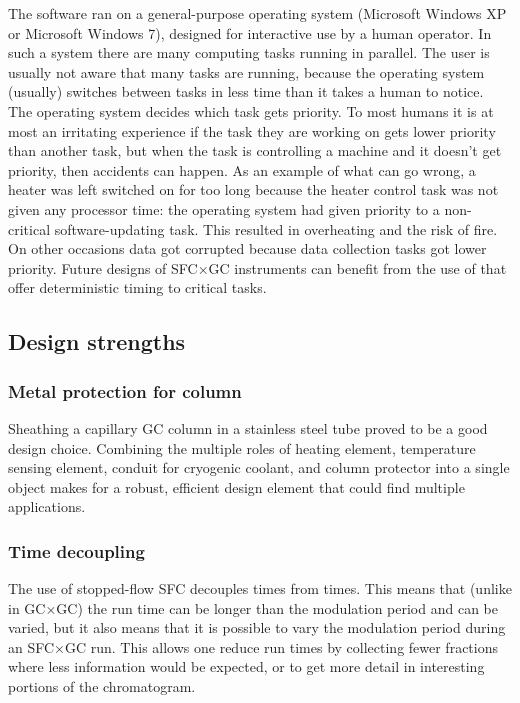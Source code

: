 The software ran on a general-purpose operating system (Microsoft Windows XP or
Microsoft Windows 7), designed for interactive use by a human operator. In such
a system there are many computing tasks running in parallel. The user is usually
not aware that many tasks are running, because the operating system (usually)
switches between tasks in less time than it takes a human to notice. The
operating system decides which task gets priority. To most humans it is at most
an irritating experience if the task they are working on gets lower priority
than another task, but when the task is controlling a machine and it doesn't get
priority, then accidents can happen. As an example of what can go wrong, a
heater was left switched on for too long because the heater control task was not
given any processor time: the operating system had given priority to a
non-critical software-updating task. This resulted in overheating and the risk
of fire. On other occasions data got corrupted because data collection tasks got
lower priority. Future designs of SFC×GC instruments can benefit from the use of
 that offer deterministic timing to
critical tasks.

\subsection{Design strengths}

\subsubsection{Metal protection for column}

Sheathing a capillary GC column in a stainless steel tube proved to be a good
design choice. Combining the multiple roles of heating element, temperature
sensing element, conduit for cryogenic coolant, and column protector into a
single object makes for a robust, efficient design element that could find
multiple applications.

\subsubsection{Time decoupling}

The use of stopped-flow SFC decouples \oneD times from \twoD times. This means
that (unlike in GC×GC) the \twoD run time can be longer than the modulation
period and can be varied, but it also means that it is possible to vary the
modulation period during an SFC×GC run. This allows one  reduce run times by
collecting fewer fractions where less information would be expected, or to get
more detail in interesting portions of the \oneD chromatogram.

